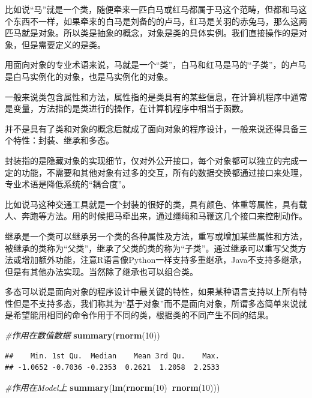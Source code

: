 \documentclass[]{book}
\newenvironment{Shaded}{\begin{snugshade}}{\end{snugshade}}
\newcommand{\KeywordTok}[1]{\textcolor[rgb]{0.13,0.29,0.53}{\textbf{#1}}}
\newcommand{\DecValTok}[1]{\textcolor[rgb]{0.00,0.00,0.81}{#1}}
\newcommand{\CommentTok}[1]{\textcolor[rgb]{0.56,0.35,0.01}{\textit{#1}}}
\newcommand{\OperatorTok}[1]{\textcolor[rgb]{0.81,0.36,0.00}{\textbf{#1}}}
\newcommand{\NormalTok}[1]{#1}
\begin{document}
比如说``马''就是一个类，随便牵来一匹白马或红马都属于马这个范畴，但都和马这个东西不一样，如果牵来的白马是刘备的的卢马，红马是关羽的赤兔马，那么这两匹马就是对象。所以类是抽象的概念，对象是类的具体实例。我们直接操作的是对象，但是需要定义的是类。

用面向对象的专业术语来说，马就是一个``类''，白马和红马是马的``子类''，的卢马是白马实例化的对象，也是马实例化的对象。

一般来说类包含属性和方法，属性指的是类具有的某些信息，在计算机程序中通常是变量，方法指的是类进行的操作，在计算机程序中相当于函数。

并不是具有了类和对象的概念后就成了面向对象的程序设计，一般来说还得具备三个特性：封装、继承和多态。

封装指的是隐藏对象的实现细节，仅对外公开接口，每个对象都可以独立的完成一定的功能，不需要和其他对象有过多的交互，所有的数据交换都通过接口来处理，专业术语是降低系统的``耦合度''。

比如说马这种交通工具就是一个封装的很好的类，具有颜色、体重等属性，具有载人、奔跑等方法。用的时候把马牵出来，通过缰绳和马鞭这几个接口来控制动作。

继承是一个类可以继承另一个类的各种属性及方法，重写或增加某些属性和方法，被继承的类称为``父类''，继承了父类的类的称为``子类''。通过继承可以重写父类方法或增加额外功能，注意R语言像Python一样支持多重继承，Java不支持多继承，但是有其他办法实现。当然除了继承也可以组合类。

多态可以说是面向对象的程序设计中最关键的特性，如果某种语言支持以上所有特性但是不支持多态，我们称其为``基于对象''而不是面向对象，所谓多态简单来说就是希望能用相同的命令作用于不同的类，根据类的不同产生不同的结果。

\begin{Shaded}
\begin{Highlighting}[]
\CommentTok{#作用在数值数据}
\KeywordTok{summary}\NormalTok{(}\KeywordTok{rnorm}\NormalTok{(}\DecValTok{10}\NormalTok{))}
\end{Highlighting}
\end{Shaded}

\begin{verbatim}
##    Min. 1st Qu.  Median    Mean 3rd Qu.    Max. 
## -1.0652 -0.7036 -0.2353  0.2621  1.2058  2.2533
\end{verbatim}

\begin{Shaded}
\begin{Highlighting}[]
\CommentTok{#作用在Model上}
\KeywordTok{summary}\NormalTok{(}\KeywordTok{lm}\NormalTok{(}\KeywordTok{rnorm}\NormalTok{(}\DecValTok{10}\NormalTok{)}\OperatorTok{~}\KeywordTok{rnorm}\NormalTok{(}\DecValTok{10}\NormalTok{)))}
\end{Highlighting}
\end{Shaded}
\end{document}
